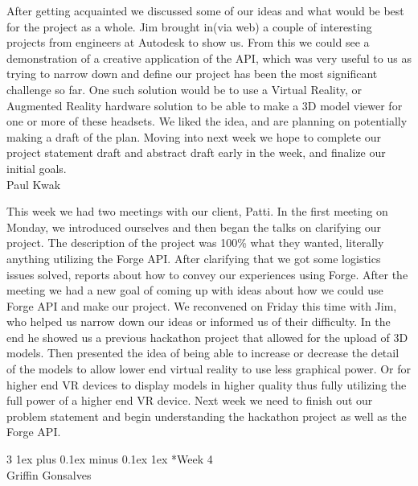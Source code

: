 \documentclass[letterpaper, 10pt, draftclsnofoot, compsoc, onecolumn]{IEEEtran}
\makeatletter
\def\subsubsection{\@startsection{subsubsection}%
                                 {3}%
                                 {\z@}%
                                 {1ex plus 0.1ex minus 0.1ex}%
                                 {1ex}%
                                 {\normalfont\normalsize}}%
\makeatother
\begin{document}
After getting acquainted we discussed some of our ideas and what would be best for the project as a whole. Jim brought in(via web) a couple of interesting projects from engineers at Autodesk to show us. From this we could see a demonstration of a creative application of the API, which was very useful to us as trying to narrow down and define our project has been the most significant challenge so far. One such solution would be to use a Virtual Reality, or Augmented Reality hardware solution to be able to make a 3D model viewer for one or more of these headsets. We liked the idea, and are planning on potentially making a draft of the plan. Moving into next week we hope to complete our project statement draft and abstract draft early in the week, and finalize our initial goals.\\

Paul Kwak

This week we had two meetings with our client, Patti. In the first meeting on Monday, we introduced ourselves and then began the talks on clarifying our project. The description of the project was 100\% what they wanted, literally anything utilizing the Forge API. After clarifying that we got some logistics issues solved, reports about how to convey our experiences using Forge. After the meeting we had a new goal of coming up with ideas about how we could use Forge API and make our project. We reconvened on Friday this time with Jim, who helped us narrow down our ideas or informed us of their difficulty. In the end he showed us a previous hackathon project that allowed for the upload of 3D models. Then presented the idea of being able to increase or decrease the detail of the models to allow lower end virtual reality to use less graphical power. Or for higher end VR devices to display models in higher quality thus fully utilizing the full power of a higher end VR device. Next week we need to finish out our problem statement and begin understanding the hackathon project as well as the Forge API.

\subsubsection*{Week 4}\hspace*{\fill} \\
Griffin Gonsalves
\end{document}
